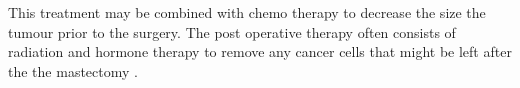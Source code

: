 This treatment may be combined with chemo therapy to decrease the size the tumour prior to the surgery. The post operative therapy often consists of radiation and hormone therapy to remove any cancer cells that might be left after the the mastectomy \cite{NationalInstitutesofHealthNIH-NationalCancerInstituteNCIBreastTreatment}.
